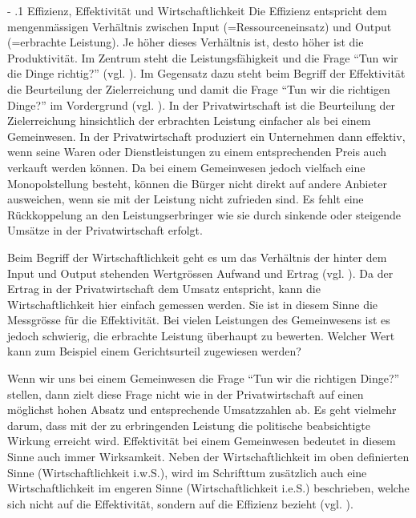 \documentclass[10pt]{article}
\makeatletter
\renewcommand\paragraph{\@startsection{paragraph}{3}{0mm}{-\baselineskip}{.1\baselineskip}{\normalfont\normalsize\bfseries}}
\renewcommand\paragraph{%
\@startsection{paragraph}{3}{0mm}%
{-\baselineskip}%
{.1\baselineskip}%
{\normalfont\normalsize\bfseries}}
\makeatother
\begin{document}
\paragraph{Effizienz, Effektivität und Wirtschaftlichkeit}\label{para:effizienz__effektivitaet_und_wirtschaftlichkeit}
Die Effizienz entspricht dem mengenmässigen Verhältnis zwischen Input (=Ressourceneinsatz) und Output (=erbrachte Leistung). Je höher dieses Verhältnis ist, desto höher ist die Produktivität. Im Zentrum steht die Leistungsfähigkeit und die Frage “{}Tun wir die Dinge richtig?”{} (vgl. \cite[188]{Thommen2008}). Im Gegensatz dazu steht beim Begriff der Effektivität die Beurteilung der Zielerreichung und damit die Frage “{}Tun wir die richtigen Dinge?”{} im Vordergrund (vgl. \cite[186]{Thommen2008}). In der Privatwirtschaft ist die Beurteilung der Zielerreichung hinsichtlich der erbrachten Leistung einfacher als bei einem Gemeinwesen. In der Privatwirtschaft produziert ein Unternehmen dann effektiv, wenn seine Waren oder Dienstleistungen zu einem entsprechenden Preis auch verkauft werden können. Da bei einem Gemeinwesen jedoch vielfach eine Monopolstellung besteht, können die Bürger nicht direkt auf andere Anbieter ausweichen, wenn sie mit der Leistung nicht zufrieden sind. Es fehlt eine Rückkoppelung an den Leistungserbringer wie sie durch sinkende oder steigende Umsätze in der Privatwirtschaft erfolgt.~

Beim Begriff der Wirtschaftlichkeit geht es um das Verhältnis der hinter dem Input und Output stehenden Wertgrössen Aufwand und Ertrag (vgl. \cite[715]{Thommen2008}). Da der Ertrag in der Privatwirtschaft dem Umsatz entspricht, kann die Wirtschaftlichkeit hier einfach gemessen werden. Sie ist in diesem Sinne die Messgrösse für die Effektivität. Bei vielen Leistungen des Gemeinwesens ist es jedoch schwierig, die erbrachte Leistung überhaupt zu bewerten. Welcher Wert kann zum Beispiel einem Gerichtsurteil zugewiesen werden?~

Wenn wir uns bei einem Gemeinwesen die Frage “{}Tun wir die richtigen Dinge?”{} stellen, dann zielt diese Frage nicht wie in der Privatwirtschaft auf einen möglichst hohen Absatz und entsprechende Umsatzzahlen ab. Es geht vielmehr darum, dass mit der zu erbringenden Leistung die politische beabsichtigte Wirkung erreicht wird. Effektivität bei einem Gemeinwesen bedeutet in diesem Sinne auch immer Wirksamkeit. Neben der Wirtschaftlichkeit im oben definierten Sinne (Wirtschaftlichkeit i.w.S.), wird im Schrifttum zusätzlich auch eine Wirtschaftlichkeit im engeren Sinne (Wirtschaftlichkeit i.e.S.) beschrieben, welche sich nicht auf die Effektivität, sondern auf die Effizienz bezieht (vgl. \cite[S. 23]{Thaesler2012}).
\end{document}
